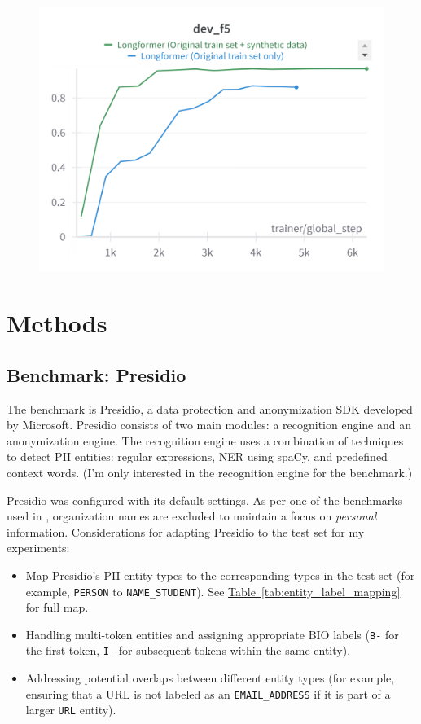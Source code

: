 \documentclass[11pt]{article}
\newcommand{\Tablink}[1]{\hyperref[#1]{Table~\ref*{#1}}}
\begin{document}
\begin{figure}[H]
  \centering
  \includegraphics[width=\columnwidth]{images/dev_f5.png}
  \label{fig:dev_f5}
\end{figure}

\section{Methods}

\subsection{Benchmark: Presidio}

The benchmark is Presidio, a data protection and anonymization SDK developed by Microsoft. Presidio \cite{Presidio} consists of two main modules: a recognition engine and an anonymization engine. The recognition engine uses a combination of techniques to detect PII entities: regular expressions, NER using spaCy, and predefined context words. (I'm only interested in the recognition engine for the benchmark.)

Presidio was configured with its default settings. As per one of the benchmarks used in \citealt{pilan-etal-2022-text}, organization names are excluded to maintain a focus on \textit{personal} information. Considerations for adapting Presidio to the test set for my experiments:

\begin{itemize}
  \item Map Presidio's PII entity types to the corresponding types in the test set (for example, \texttt{PERSON} to \texttt{NAME\_STUDENT}). See \Tablink{tab:entity_label_mapping} for full map.
  \item Handling multi-token entities and assigning appropriate BIO labels (\texttt{B-} for the first token, \texttt{I-} for subsequent tokens within the same entity).
  \item Addressing potential overlaps between different entity types (for example, ensuring that a URL is not labeled as an \texttt{EMAIL\_ADDRESS} if it is part of a larger \texttt{URL} entity).
\end{itemize}
\end{document}
